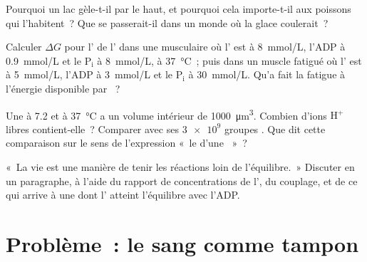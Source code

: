 \begin{exercise}[$\star\star$]\label{exo:b1:water-small-molecules:9}
Pourquoi un lac gèle-t-il par le haut, et pourquoi cela importe-t-il aux
poissons qui l'habitent~? Que se passerait-il dans un monde où la glace
coulerait~?
\end{exercise}

\begin{exercise}[$\star\star\star$]\label{exo:b1:water-small-molecules:10}
Calculer $\Delta G$ pour l' de l' dans une 
musculaire où l' est à \qty{8}{mmol/L}, l'ADP à \qty{0.9}{mmol/L} et
le $\mathrm{P_i}$ à \qty{8}{mmol/L}, à \qty{37}{\celsius}~; puis dans un
muscle fatigué où l' est à \qty{5}{mmol/L}, l'ADP à \qty{3}{mmol/L}
et le $\mathrm{P_i}$ à \qty{30}{mmol/L}. Qu'a fait la fatigue à
l'énergie disponible par ~?
\end{exercise}

\begin{exercise}[$\star\star\star$]\label{exo:b1:water-small-molecules:11}
Une  à  7.2 et à \qty{37}{\celsius} a un volume intérieur de
\qty{1000}{\micro m^3}. Combien d'ions $\mathrm{H^+}$ libres
contient-elle~? Comparer avec ses $\num{3e9}$ groupes . Que dit
cette comparaison sur le sens de l'expression «~le  d'une ~»~?
\end{exercise}

\begin{exercise}[$\star\star\star$]\label{exo:b1:water-small-molecules:12}
«~La vie est une manière de tenir les réactions loin de l'équilibre.~»
Discuter en un paragraphe, à l'aide du rapport de concentrations de
l', du couplage, et de ce qui arrive à une  dont l' atteint
l'équilibre avec l'ADP.
\end{exercise}

\section{Problème~: le sang comme tampon}

